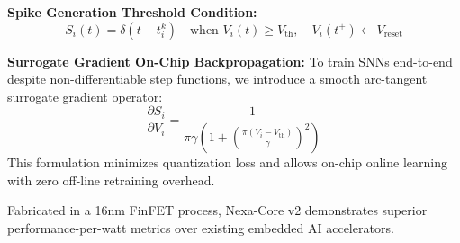 \documentclass[final]{beamer}
\begin{document}
\begin{frame}[t]
\begin{minipage}[t]{0.31\textwidth}
\begin{tcolorbox}[purplebox, title={\faCogs \;\; Mathematical \& Algorithmic Formulation}]
    \vspace{8pt}
    \textbf{\textcolor{TextWhite}{Spike Generation Threshold Condition:}}
    \begin{equation*}
      S_i(t) = \delta(t - t_i^k) \quad \text{when } V_i(t) \ge V_{\text{th}}, \quad V_i(t^+) \leftarrow V_{\text{reset}}
    \end{equation*}

    \vspace{8pt}
    \textbf{\textcolor{TextWhite}{Surrogate Gradient On-Chip Backpropagation:}}
    To train SNNs end-to-end despite non-differentiable step functions, we introduce a smooth arc-tangent surrogate gradient operator:
    \begin{equation*}
      \frac{\partial S_i}{\partial V_i} = \frac{1}{\pi \gamma \left(1 + \left(\frac{\pi (V_i - V_{\text{th}})}{\gamma}\right)^2\right)}
    \end{equation*}
    This formulation minimizes quantization loss and allows on-chip online learning with zero off-line retraining overhead.
  \end{tcolorbox}

  \vspace{15pt}

  \begin{tcolorbox}[purplebox, title={\faServer \;\; Hardware Microarchitecture Benchmarks}]
    Fabricated in a 16nm FinFET process, Nexa-Core v2 demonstrates superior performance-per-watt metrics over existing embedded AI accelerators.

    \vspace{10pt}
    \centering
    \renewcommand{\arraystretch}{1.4}
%


\end{tcolorbox}
\end{minipage}
\end{frame}
\end{document}

